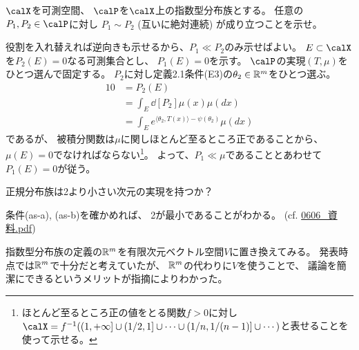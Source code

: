 \documentclass[report]{jlreq}
\begin{document}
\begin{problem}
    $\calX$を可測空間、
    $\calP$を$\calX$上の指数型分布族とする。
    任意の$P_1, P_2 \in \calP$に対し
    $P_1 \sim P_2$ (互いに絶対連続) が成り立つことを示せ。
\end{problem}

\begin{answer}
    役割を入れ替えれば逆向きも示せるから、$P_1 \ll P_2$のみ示せばよい。
    $E \subset \calX$を$P_2(E) = 0$なる可測集合とし、
    $P_1(E) = 0$を示す。
    $\calP$の実現$(T, \mu)$をひとつ選んで固定する。
    $P_2$に対し定義2.1条件(E3)の$\theta_2 \in \mathbb{R}^m$をひとつ選ぶ。
    \begin{alignat}{1}
        0
            &= P_2(E) \\
            &= \int_E \dd[P_2]{\mu}(x) \mu(dx) \\
            &= \int_E e^{\langle \theta_2, T(x) \rangle - \psi(\theta_2)} \mu(dx)
    \end{alignat}
    であるが、
    被積分関数は$\mu$に関しほとんど至るところ正であることから、
    $\mu(E) = 0$でなければならない\footnote{
        ほとんど至るところ正の値をとる関数$f > 0$に対し
        $\calX = f^{-1}(
            (1, +\infty]
            \cup (1/2, 1]
            \cup \cdots
            \cup (1/n, 1/(n - 1)]
            \cup \cdots
        )$と表せることを使って示せる。
    }。
    よって、$P_1 \ll \mu$であることとあわせて
    $P_1(E) = 0$が従う。
\end{answer}

\begin{problem}
    正規分布族は2より小さい次元の実現を持つか？
\end{problem}

\begin{answer}
    条件(as-a), (as-b)を確かめれば、
    2が最小であることがわかる。
    (cf. \url{0606_資料.pdf})
\end{answer}

指数型分布族の定義の$\mathbb{R}^m$を有限次元ベクトル空間$V$に置き換えてみる。
発表時点では$\mathbb{R}^m$で十分だと考えていたが、
$\mathbb{R}^m$の代わりに$V$を使うことで、
議論を簡潔にできるというメリットが指摘によりわかった。
\end{document}
